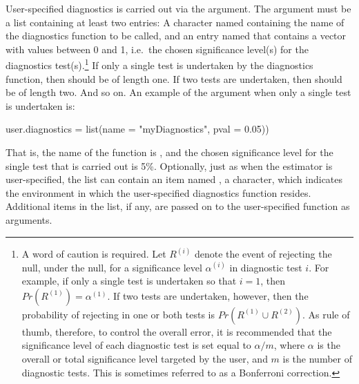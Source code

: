 User-specified diagnostics is carried out via the  argument. The argument must be a list containing at least two entries: A character named  containing the name of the diagnostics function to be called, and an entry named  that contains a vector with values between 0 and 1, i.e.\ the chosen significance level(s) for the diagnostics test(s).\footnote{A word of caution is required. Let $R^{(i)}$ denote the event of rejecting the null, under the null, for a significance level $\alpha^{(i)}$ in diagnostic test $i$. For example, if only a single test is undertaken so that $i=1$, then $Pr(R^{(1)}) = \alpha^{(1)}$. If two tests are undertaken, however, then the probability of rejecting in one or both tests is $Pr(R^{(1)} \cup R^{(2)})$. As rule of thumb, therefore, to control the overall error, it is recommended that the significance level of each diagnostic test is set equal to $\alpha/m$, where $\alpha$ is the overall or total significance level targeted by the user, and $m$ is the number of diagnostic tests. This is sometimes referred to as a Bonferroni correction.} If only a single test is undertaken by the diagnostics function, then  should be of length one. If two tests are undertaken, then  should be of length two. And so on. An example of the argument when only a single test is undertaken is:
%
\begin{example}
  user.diagnostics = list(name = "myDiagnostics", pval = 0.05))
\end{example}
%
That is, the name of the function is , and the chosen significance level for the single test that is carried out is 5\%. Optionally, just as when the estimator is user-specified, the list can contain an item named , a character, which indicates the environment in which the user-specified diagnostics function resides. Additional items in the list, if any, are passed on to the user-specified function as arguments.

